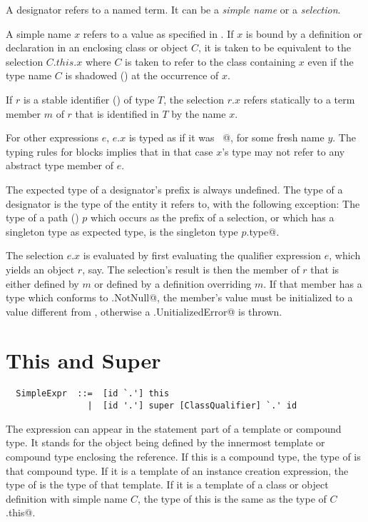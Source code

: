 A designator refers to a named term. It can be a {\em simple name} or
a {\em selection}. 

A simple name $x$ refers to a value as specified in .
If $x$ is bound by a definition or declaration in an enclosing class
or object $C$, it is taken to be equivalent to the selection
$C.this.x$ where $C$ is taken to refer to the class containing $x$
even if the type name $C$ is shadowed () at the
occurrence of $x$.

If $r$ is a stable identifier
() of type $T$, the selection $r.x$ refers
statically to a term member $m$ of $r$ that is identified in $T$ by
the name $x$.   

For other expressions $e$, $e.x$ is typed as
if it was ~@, for some fresh name
$y$.  The typing rules for blocks implies that in that case $x$'s type
may not refer to any abstract type member of $e$.

The expected type of a designator's prefix is always undefined.  The
type of a designator is the type of the entity it refers to, with the
following exception: The type of a path () $p$ which
occurs as the prefix of a selection, or which has a singleton type as
expected type, is the singleton type \lstinline@$p$.type@.

The selection $e.x$ is evaluated by first evaluating the qualifier
expression $e$, which yields an object $r$, say. The selection's
result is then the member of $r$ that is either defined by $m$ or defined
by a definition overriding $m$. If that member has a type which
conforms to \@scala.NotNull@, the member's value must be initialized
to a value different from \@null@, otherwise a \@scala.UnitializedError@
is thrown.
 

\section{This and Super}
\label{sec:this-super}

\syntax\begin{lstlisting}
  SimpleExpr  ::=  [id `.'] this
                |  [id '.'] super [ClassQualifier] `.' id
\end{lstlisting}

The expression  can appear in the statement part of a
template or compound type. It stands for the object being defined by
the innermost template or compound type enclosing the reference. If
this is a compound type, the type of  is that compound type.
If it is a template of an instance creation expression, the type of
 is the type of that template. If it is a template of a
class or object definition with simple name $C$, the type of this
is the same as the type of \lstinline@$C$.this@.

